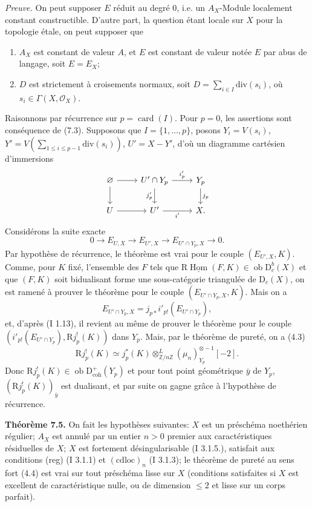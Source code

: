 \documentclass[11pt]{article}
\DeclareMathOperator{\Hom}{Hom}
\newcommand{\R}{\mathrm{R}}
\newcommand{\D}{\mathrm{D}}
\newcommand{\Z}{\mathbb{Z}}
\newcommand{\ob}{\operatorname{ob}}
\providecommand{\Hom}{\operatorname{Hom}}
\providecommand{\ob}{\operatorname{ob}}
\providecommand{\R}{\mathrm R}
\providecommand{\Z}{\mathbb Z}
\providecommand{\Hom}{\operatorname{Hom}}
\begin{document}
\emph{Preuve.} On peut supposer $E$ réduit au degré $0$, i.e. un $A_X$-Module localement constant constructible. D'autre part, la question étant locale sur $X$ pour la topologie étale, on peut supposer que
\begin{enumerate}[label=(\alph*)]
\item $A_X$ est constant de valeur $A$, et $E$ est constant de valeur notée $E$ par abus de langage, soit $E=E_X$;
\item $D$ est strictement à croisements normaux, soit $D=\sum_{i\in I}\mathrm{div}(s_i)$, où $s_i\in\Gamma(X,\mathcal{O}_X)$.
\end{enumerate}
Raisonnons par récurrence sur $p=\operatorname{card}(I)$. Pour $p=0$, les assertions sont conséquence de (7.3). Supposons que $I=\{1,\ldots,p\}$, posons $Y_i=V(s_i)$, $Y'=V(\sum_{1\leq i\leq p-1}\mathrm{div}(s_i))$, $U'=X-Y'$, d'où un diagramme cartésien d'immersions
\[
\begin{tikzcd}
\varnothing \arrow[r] \arrow[d] & U'\cap Y_p \arrow[r,"i'_p"] \arrow[d,"j'_p"'] & Y_p \arrow[d,"j_p"]\\
U \arrow[r] & U' \arrow[r,"i'"'] & X.
\end{tikzcd}
\]
Considérons la suite exacte
\[
        0\longrightarrow E_{U,X}\longrightarrow E_{U',X}\longrightarrow E_{U'\cap Y_p,X}\longrightarrow0.
\]
Par hypothèse de récurrence, le théorème est vrai pour le couple $(E_{U',X},K)$. Comme, pour $K$ fixé, l'ensemble des $F$ tels que $\R\underline{\Hom}(F,K)\in\ob\D_c^b(X)$ et que $(F,K)$ soit bidualisant forme une sous-catégorie triangulée de $\D_c(X)$, on est ramené à prouver le théorème pour le couple $(E_{U'\cap Y_p,X},K)$. Mais on a
\[
        E_{U'\cap Y_p,X}=j_{p*}i'_{p!}(E_{U'\cap Y_p}),
\]
et, d'après (I 1.13), il revient au même de prouver le théorème pour le couple $(i'_{p!}(E_{U'\cap Y_p}),\R j_p^!(K))$ dans $Y_p$. Mais, par le théorème de pureté, on a (4.3)
\[
        \R j_p^!(K)\simeq j_p^*(K)\otimes^L_{\Z/n\Z}(\mu_n)_{Y_p}^{\otimes -1}[-2].
\]
Donc $\R j_p^!(K)\in\ob\D^{+}_{\mathrm{coh}}(Y_p)$ et pour tout point géométrique $\bar{y}$ de $Y_p$, $(\R j_p^!(K))_{\bar{y}}$ est dualisant, et par suite on gagne grâce à l'hypothèse de récurrence.

\textbf{Théorème 7.5.} On fait les hypothèses suivantes: $X$ est un préschéma noethérien régulier; $A_X$ est annulé par un entier $n>0$ premier aux caractéristiques résiduelles de $X$; $X$ est fortement désingularisable (I 3.1.5.), satisfait aux conditions (reg) (I 3.1.1) et $(\mathrm{cdloc})_n$ (I 3.1.3); le théorème de pureté au sens fort (4.4) est vrai sur tout préschéma lisse sur $X$ (conditions satisfaites si $X$ est excellent de caractéristique nulle, ou de dimension $\leq2$ et lisse sur un corps parfait).
\end{document}
